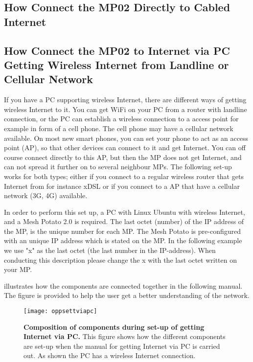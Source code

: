 \subsection{How Connect the MP02 Directly to Cabled Internet}
\label{subsec:cabledInternet}

\clearpage
\subsection{How Connect the MP02 to Internet via PC Getting Wireless Internet from Landline or Cellular Network}
\label{subsec:internetviaPC}

If you have a PC supporting wireless Internet, there are different ways of getting wireless Internet to it. You can get WiFi on your PC from a router with landline connection, or the PC can establish a wireless connection to a access point for example in form of a cell phone. The cell phone may have a cellular network available. On most new smart phones, you can set your phone to act as an access point (AP), so that other devices can connect to it and get Internet. You can off course connect directly to this AP, but then the MP does not get Internet, and can not spread it further on to several neighbour MPs. The following set-up works for both types; either if you connect to a regular wireless router that gets Internet from for instance xDSL or if you connect to a AP that have a cellular network (3G, 4G) available. 

In order to perform this set up, a PC with Linux Ubuntu with wireless Internet, and a Mesh Potato 2.0 is required. The last octet (number) of the IP address of the MP, is the unique number for each MP. The Mesh Potato is pre-configured with an unique IP address which is stated on the MP. In the following example we use "x" as the last octet (the last number in the IP-address). When conducting this description please change the x with the last octet written on your MP.

 illustrates how the components are connected together in the following manual. The figure is provided to help the user get a better understanding of the network. 

\begin{figure}[h!]
  \centering
      \texttt{[image: oppsettviapc]}
  \caption [Composition of components during set-up of getting Internet via PC]{\textbf{Composition of components during set-up of getting Internet via PC.} This figure shows how the different components are set-up when the manual for getting Internet via PC is carried out. As shown the PC has a wireless Internet connection.}
  \label{fig:oppsettviapc}
\end{figure}

